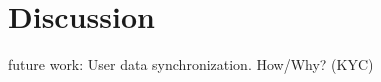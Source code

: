 \chapter{Discussion}
\label{chapter:discussion}

future work:
User data synchronization. How/Why?
(KYC)
